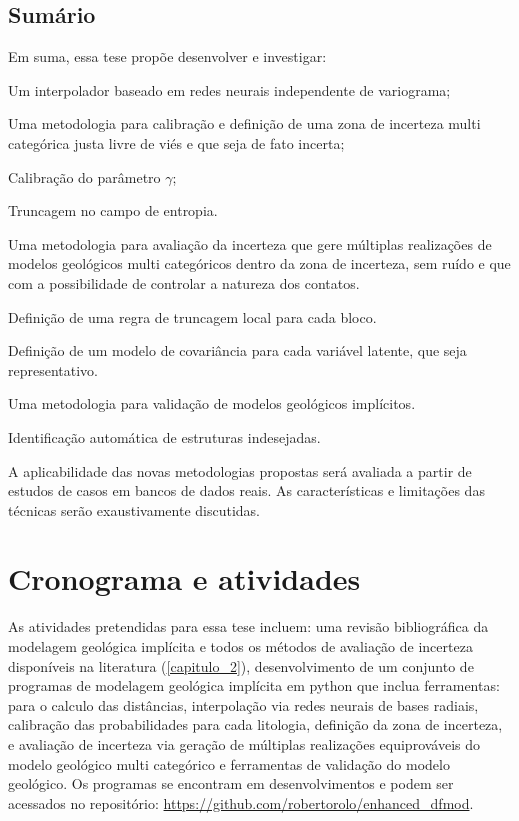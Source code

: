 \subsection{Sumário}

Em suma, essa tese propõe desenvolver e investigar:

\newcommand{\SubItem}[1]{
	{\setlength\itemindent{15pt} \item[-] #1}
}

\begin{itemize}
	\item Um interpolador baseado em redes neurais independente de variograma;
	\item Uma metodologia para calibração e definição de uma zona de incerteza multi categórica justa livre de viés e que seja de fato incerta;
		\SubItem{Calibração do parâmetro $\gamma$;}
		\SubItem{Truncagem no campo de entropia.}
	\item Uma metodologia para avaliação da incerteza que gere múltiplas realizações de modelos geológicos multi categóricos dentro da zona de incerteza, sem ruído e que com a possibilidade de controlar a natureza dos contatos.
		\SubItem{Definição de uma regra de truncagem local para cada bloco.}
		\SubItem{Definição de um modelo de covariância para cada variável latente, que seja representativo.}
	\item Uma metodologia para validação de modelos geológicos implícitos.
		\SubItem{Identificação automática de estruturas indesejadas.}  
\end{itemize}

A aplicabilidade das novas metodologias propostas será avaliada a partir de estudos de casos em bancos de dados reais. As características e limitações das técnicas serão exaustivamente discutidas.

\section{Cronograma e atividades}

As atividades pretendidas para essa tese incluem: uma revisão bibliográfica da modelagem geológica implícita e todos os métodos de avaliação de incerteza disponíveis na literatura (\autoref{capitulo_2}), desenvolvimento de um conjunto de programas de modelagem geológica implícita em python que inclua ferramentas: para o calculo das distâncias, interpolação via redes neurais de bases radiais, calibração das probabilidades para cada litologia, definição da zona de incerteza, e avaliação de incerteza via geração de múltiplas realizações equiprováveis do modelo geológico multi categórico e ferramentas de validação do modelo geológico. Os programas se encontram em desenvolvimentos e podem ser acessados no repositório: \url{https://github.com/robertorolo/enhanced_dfmod}.

